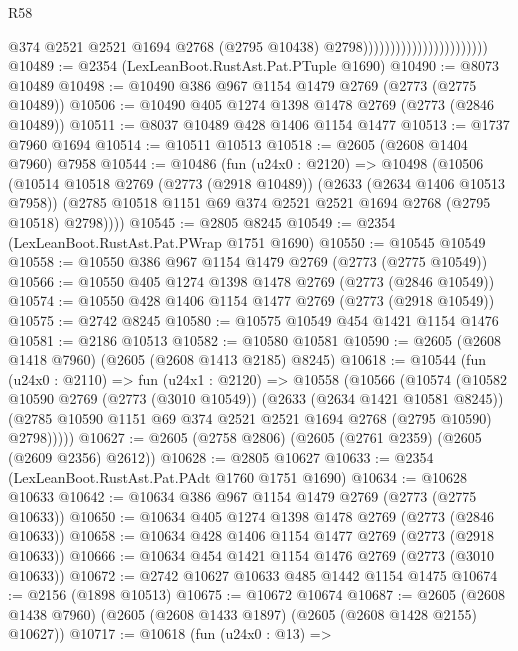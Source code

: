 \begin{lexlean}{R58}
\begin{coremodule}
                                                  @374
                                                  @2521
                                                  @2521
                                                  @1694
                                                  @2768
                                                  (@2795 @10438)
                                                  @2798)))))))))))))))))))))))
@10489 := @2354 (LexLeanBoot.RustAst.Pat.PTuple @1690)
@10490 := @8073 @10489
@10498 := @10490 @386 @967 @1154 @1479 @2769 (@2773 (@2775 @10489))
@10506 := @10490 @405 @1274 @1398 @1478 @2769 (@2773 (@2846 @10489))
@10511 := @8037 @10489 @428 @1406 @1154 @1477
@10513 := @1737 @7960 @1694
@10514 := @10511 @10513
@10518 := @2605 (@2608 @1404 @7960) @7958
@10544 := @10486
    (fun (u24x0 : @2120) =>
    @10498
      (@10506
        (@10514
          @10518
          @2769
          (@2773 (@2918 @10489))
          (@2633 (@2634 @1406 @10513 @7958))
          (@2785 @10518 @1151 @69 @374 @2521 @2521 @1694 @2768 (@2795 @10518) @2798))))
@10545 := @2805 @8245
@10549 := @2354 (LexLeanBoot.RustAst.Pat.PWrap @1751 @1690)
@10550 := @10545 @10549
@10558 := @10550 @386 @967 @1154 @1479 @2769 (@2773 (@2775 @10549))
@10566 := @10550 @405 @1274 @1398 @1478 @2769 (@2773 (@2846 @10549))
@10574 := @10550 @428 @1406 @1154 @1477 @2769 (@2773 (@2918 @10549))
@10575 := @2742 @8245
@10580 := @10575 @10549 @454 @1421 @1154 @1476
@10581 := @2186 @10513
@10582 := @10580 @10581
@10590 := @2605 (@2608 @1418 @7960) (@2605 (@2608 @1413 @2185) @8245)
@10618 := @10544
    (fun (u24x0 : @2110) =>
    fun (u24x1 : @2120) =>
    @10558
      (@10566
        (@10574
          (@10582
            @10590
            @2769
            (@2773 (@3010 @10549))
            (@2633 (@2634 @1421 @10581 @8245))
            (@2785 @10590 @1151 @69 @374 @2521 @2521 @1694 @2768 (@2795 @10590) @2798)))))
@10627 := @2605 (@2758 @2806) (@2605 (@2761 @2359) (@2605 (@2609 @2356) @2612))
@10628 := @2805 @10627
@10633 := @2354 (LexLeanBoot.RustAst.Pat.PAdt @1760 @1751 @1690)
@10634 := @10628 @10633
@10642 := @10634 @386 @967 @1154 @1479 @2769 (@2773 (@2775 @10633))
@10650 := @10634 @405 @1274 @1398 @1478 @2769 (@2773 (@2846 @10633))
@10658 := @10634 @428 @1406 @1154 @1477 @2769 (@2773 (@2918 @10633))
@10666 := @10634 @454 @1421 @1154 @1476 @2769 (@2773 (@3010 @10633))
@10672 := @2742 @10627 @10633 @485 @1442 @1154 @1475
@10674 := @2156 (@1898 @10513)
@10675 := @10672 @10674
@10687 := @2605 (@2608 @1438 @7960) (@2605 (@2608 @1433 @1897) (@2605 (@2608 @1428 @2155) @10627))
@10717 := @10618
    (fun (u24x0 : @13) =>

\end{coremodule}
\end{lexlean}
